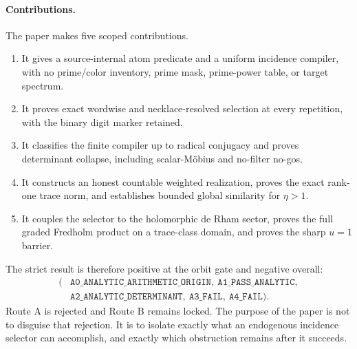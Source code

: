 \paragraph{Contributions.}
The paper makes five scoped contributions.
\begin{enumerate}
  \item It gives a source-internal atom predicate and a uniform incidence
  compiler, with no prime/color inventory, prime mask, prime-power table, or
  target spectrum.
  \item It proves exact wordwise and necklace-resolved selection at every
  repetition, with the binary digit marker retained.
  \item It classifies the finite compiler up to radical conjugacy and proves
  determinant collapse, including scalar-Möbius and no-filter no-gos.
  \item It constructs an honest countable weighted realization, proves the
  exact rank-one trace norm, and establishes bounded global similarity for
  \(\eta>1\).
  \item It couples the selector to the holomorphic de Rham sector, proves the
  full graded Fredholm product on a trace-class domain, and proves the sharp
  \(u=1\) barrier.
\end{enumerate}

The strict result is therefore positive at the orbit gate and negative
overall:
\begin{equation*}
\begin{split}
(&\texttt{A0\_ANALYTIC\_ARITHMETIC\_ORIGIN},
\ \texttt{A1\_PASS\_ANALYTIC},\\
&\texttt{A2\_ANALYTIC\_DETERMINANT},
\ \texttt{A3\_FAIL},\ \texttt{A4\_FAIL}).
\end{split}
\end{equation*}
Route A is rejected and Route B remains locked. The purpose of the paper is
not to disguise that rejection. It is to isolate exactly what an endogenous
incidence selector can accomplish, and exactly which obstruction remains
after it succeeds.
